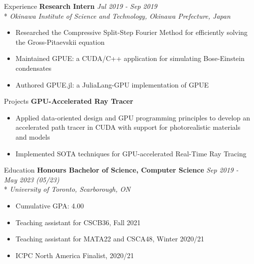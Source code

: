 \documentclass[11pt, letterpaper]{article}
\begin{document}
\begin{section}{Experience}
\textbf{Research Intern}
\hfill
\textit{Jul 2019 - Sep 2019}\\*
\textit{Okinawa Institute of Science and Technology, Okinawa Prefecture, Japan}
\begin{itemize}
  \item Researched the Compressive Split-Step Fourier Method for efficiently solving the Gross-Pitaevskii equation
  \item Maintained GPUE: a CUDA/C++ application for simulating Bose-Einstein condensates
  \item Authored GPUE.jl: a JuliaLang-GPU implementation of GPUE
\end{itemize}

\end{section}

\begin{section}{Projects}
\textbf{GPU-Accelerated Ray Tracer}
\begin{itemize}
  \item Applied data-oriented design and GPU programming principles to develop an accelerated path tracer in CUDA with support for photorealistic materials and models
  \item Implemented SOTA techniques for GPU-accelerated Real-Time Ray Tracing
\end{itemize}

\end{section}

\begin{section}{Education}
\textbf{Honours Bachelor of Science, Computer Science}
\hfill
\textit{Sep 2019 - May 2023 (05/23)}\\*
\textit{University of Toronto, Scarborough, ON}
\begin{itemize}
  \item Cumulative GPA: 4.00
  \item Teaching assistant for CSCB36, Fall 2021
  \item Teaching assistant for MATA22 and CSCA48, Winter 2020/21
  \item ICPC North America Finalist, 2020/21
\end{itemize}

\end{section}
\end{document}
